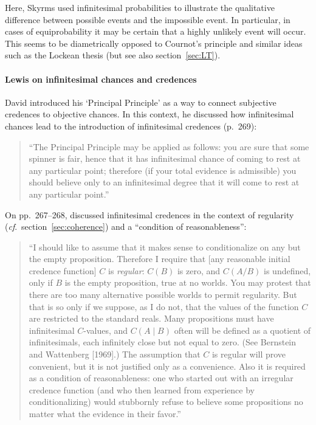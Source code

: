 Here, Skyrms used infinitesimal probabilities to illustrate the qualitative difference between possible events and the impossible event. In particular, in cases of equiprobability it may be certain that a highly unlikely event will occur. This seems to be diametrically opposed to Cournot's principle and similar ideas such as the Lockean thesis (but see also section~\ref{sec:LT}).

\paragraph{Lewis on infinitesimal chances and credences}
David \citet{Lewis:1980} introduced his `Principal Principle' as a way to connect subjective credences to objective chances. In this context, he discussed how infinitesimal chances lead to the introduction of infinitesimal credences (p.~269):
\begin{quote}
``The Principal Principle may be applied as follows: you are sure that some spinner is fair, hence that it has infinitesimal chance of coming to rest at any particular point; therefore (if your total evidence is admissible) you should believe only to an infinitesimal degree that it will come to rest at any particular point.''
\end{quote}
On pp.~267--268, \citet{Lewis:1980} discussed infinitesimal credences in the context of regularity (\textit{cf}.\ section~\ref{sec:coherence}) and a ``condition of reasonableness'':
\begin{quote}
``I should like to assume that it makes sense to conditionalize on any but the empty proposition. Therefore I require that [any reasonable initial credence function] $C$ is \textit{regular}: $C(B)$ is zero, and $C(A/B)$ is undefined, only if $B$ is the empty proposition, true at no worlds. You may protest that there are too many alternative possible worlds to permit regularity. But that is so only if we suppose, as I do not, that the values of the function $C$ are restricted to the standard reals. Many propositions must have infinitesimal $C$-values, and $C(A \mid B)$ often will be defined as a quotient of infinitesimals, each infinitely close but not equal to zero. (See Bernstein and Wattenberg [1969].) The assumption that $C$ is regular will prove convenient, but it is not justified only as a convenience. Also it is required as a condition of reasonableness: one who started
out with an irregular credence function (and who then learned from experience by conditionalizing) would stubbornly refuse to believe some propositions no matter what the evidence in their favor.''
\end{quote}

